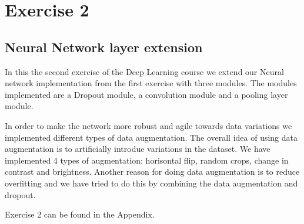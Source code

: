 \graphicspath{{Chapters/Exercise2/}}

\chapter{Exercise 2}

\section{Neural Network layer extension} %
\label{sec:Neural_Network_layer_extension}

In this the second exercise of the Deep Learning course we extend our Neural
network implementation from the first exercise with three modules. The modules
implemented are a Dropout module, a convolution module and a pooling layer
module. 

In order to make the network more robust and agile towards data variations we
implemented different types of data augmentation. The overall idea of using data
augmentation is to artificially introdue variations in the dataset. We have
implemented 4 types of augmentation: horisontal flip, random crops, change in
contrast and brightness. Another reason for doing data augmentation is to
reduce overfitting and we have tried to do this by combining the data
augmentation and dropout. 


Exercise 2 can be found in the Appendix. 


